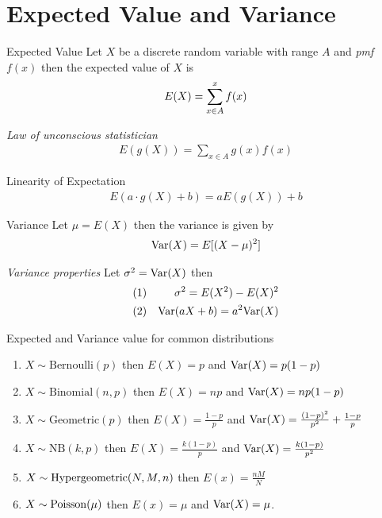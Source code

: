 \documentclass[16pt,a4paper]{article}
\begin{document}
\section{Expected Value and Variance}
\begin{defn}{Expected Value}
Let $X$ be a discrete random variable with range $A$ and \textit{pmf} $f(x)$ then the expected value of $X$ is 
\begin{align*}
E(X) = \sum\limits_{x\in A}^{x}f(x) 
\end{align*} 
\end{defn}
\begin{thm}{\textit{Law of unconscious statistician}}
\begin{align*}
E(g(X)) = \sum_{x\in A}g(x)f(x) 
\end{align*}
\end{thm}
\begin{thm}{Linearity of Expectation}
\begin{align*}
E(a\cdot g(X) + b) = aE(g(X)) + b
\end{align*}
\end{thm}
\begin{defn}{Variance}
Let $\mu = E(X)$ then the variance is given by 
\begin{align*}
\mathrm{Var}(X) = E[(X-\mu)^2]
\end{align*}
\end{defn}
\begin{thm}{\textit{Variance properties}}
Let $\sigma^2 = \mathrm{Var}(X)$ then 
\begin{align*}
(1) && \sigma^2 = E(X^2) - E(X)^2\\
(2) && \mathrm{Var}(aX+b) = a^2\mathrm{Var}(X)
\end{align*}
\end{thm}



\begin{thm}{Expected and Variance value for common distributions}
\begin{enumerate}[(1)]
\item $X \sim \mathrm{Bernoulli}(p)$ then $E(X)  =  p$ and $\mathrm{Var}(X) = p(1-p)$
\item $X \sim \mathrm{Binomial}(n,p)$ then $E(X)  =  np$ and $\mathrm{Var}(X) = np(1-p)$
\item $X \sim \mathrm{Geometric}(p)$ then $E(X)  =  \frac{1-p}{p}$ and $\mathrm{Var}(X) = \frac{(1-p)^2}{p^2} + \frac{1-p}{p}$
\item $X \sim \mathrm{NB}(k,p)$ then $E(X) = \frac{k(1-p)}{p}$ and $\mathrm{Var}(X) = \frac{k(1-p)}{p^2}$
\item $X\sim {\rm Hypergeometric}(N,M,n)$ then $E(x) = \frac{nM}{N}$
\item $X\sim {\rm Poisson}(\mu)$ then $E(x) = \mu$ and $\mathrm{Var}(X) = \mu$.
\end{enumerate}
\end{thm}
\newpage
\end{document}
